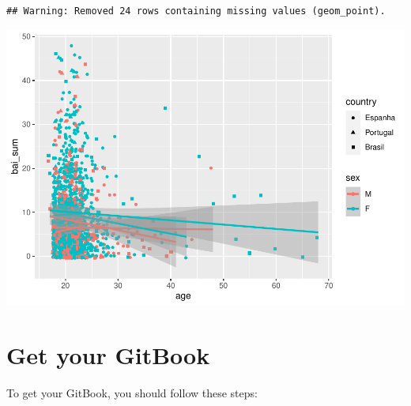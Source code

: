\documentclass[
]{book}
\begin{document}
\begin{verbatim}
## Warning: Removed 24 rows containing missing values (geom_point).
\end{verbatim}

\includegraphics{gitbook-demo_files/figure-latex/unnamed-chunk-27-1.pdf}

\hypertarget{getgitbook}{%
\chapter{Get your GitBook}\label{getgitbook}}

To get your GitBook, you should follow these steps:
\end{document}
